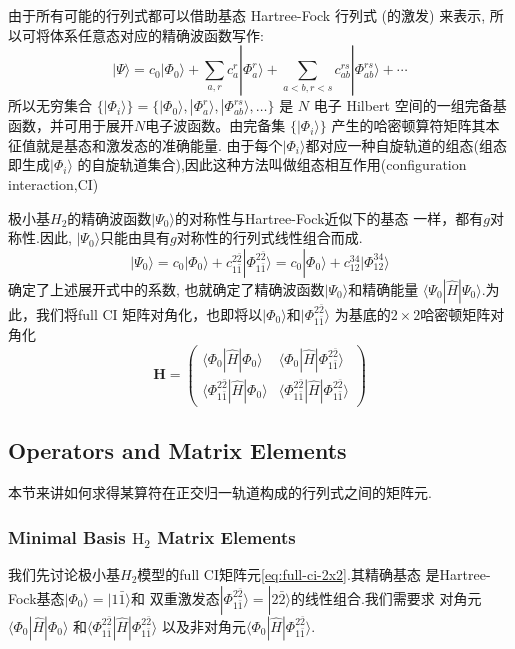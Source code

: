 \documentclass[fontset=none,12pt,a4paper]{ctexart}
\numberwithin{equation}{section}
\begin{document}
由于所有可能的行列式都可以借助基态 Hartree-Fock 行列式 (的激发) 来表示, 
所 以可将体系任意态对应的精确波函数写作:
\begin{equation}
  |\Psi\rangle = c_0 |\Phi_0\rangle + \sum_{a,r} c_a^r |\Phi_a^r\rangle + \sum_{a<b, r<s} c_{ab}^{rs} |\Phi_{ab}^{rs}\rangle + \cdots
\end{equation}
所以无穷集合 $\{|\Phi_i\rangle\}=\{|\Phi_0\rangle, |\Phi_a^r\rangle, |\Phi_{ab}^{rs}\rangle, \ldots\}$
是 $N$ 电子 Hilbert 空间的一组完备基函数，并可用于展开$N$电子波函数。由完备集
$\{|\Phi_i\rangle\}$ 产生的哈密顿算符矩阵其本征值就是基态和激发态的准确能量.
由于每个$|\Phi_i\rangle$都对应一种自旋轨道的组态(组态即生成$|\Phi_i\rangle$
的自旋轨道集合),因此这种方法叫做组态相互作用(configuration interaction,CI)

极小基$H_2$的精确波函数$|\Psi_0\rangle$的对称性与Hartree-Fock近似下的基态
一样，都有$g$对称性.因此, $|\Psi_0\rangle$只能由具有$g$对称性的行列式线性组合而成.
\begin{equation}
  |\Psi_0\rangle = c_0 |\Phi_0\rangle +
   c_{1\bar{1}}^{2\bar{2}} |\Phi_{1\bar{1}}^{2\bar{2}}\rangle= 
   c_0 |\Phi_0\rangle + c_{12}^{34} |\Phi_{12}^{34}\rangle
\end{equation}
确定了上述展开式中的系数, 也就确定了精确波函数$|\Psi_0\rangle$和精确能量
$\langle \Psi_0 | \hat{H} | \Psi_0 \rangle$.为此，我们将full CI
矩阵对角化，也即将以$|\Phi_0\rangle$和$|\Phi_{1\bar{1}}^{2\bar{2}}\rangle$
为基底的$2\times 2$哈密顿矩阵对角化
\begin{equation}
 \mathbf{H}= \begin{pmatrix}
    \langle \Phi_0 | \hat{H} | \Phi_0 \rangle & \langle \Phi_0 | \hat{H} | \Phi_{1\bar{1}}^{2\bar{2}} \rangle \\
    \langle \Phi_{1\bar{1}}^{2\bar{2}} | \hat{H} | \Phi_0 \rangle & \langle \Phi_{1\bar{1}}^{2\bar{2}} | \hat{H} | \Phi_{1\bar{1}}^{2\bar{2}} \rangle
  \end{pmatrix}
  \label{eq:full-ci-2x2}
\end{equation}
\subsection{Operators and Matrix Elements}
本节来讲如何求得某算符在正交归一轨道构成的行列式之间的矩阵元.
\subsubsection{Minimal Basis \texorpdfstring{$\mathrm{H_2}$}{H2} Matrix Elements}
我们先讨论极小基$H_2$模型的full CI矩阵元\eqref{eq:full-ci-2x2}.其精确基态
是Hartree-Fock基态$|\Phi_0\rangle=|1\bar{1}\rangle$和
双重激发态$|\Phi_{1\bar{1}}^{2\bar{2}}\rangle=|2\bar{2}\rangle$的线性组合.我们需要求
对角元$\langle\Phi_0|\hat{H}|\Phi_0\rangle$
和$\langle\Phi_{1\bar{1}}^{2\bar{2}}|\hat{H}|\Phi_{1\bar{1}}^{2\bar{2}}\rangle$
以及非对角元$\langle\Phi_0|\hat{H}|\Phi_{1\bar{1}}^{2\bar{2}}\rangle$.
\end{document}
